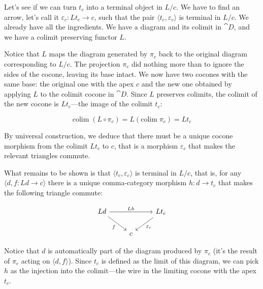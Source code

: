 \documentclass[DaoFP]{subfiles}
\begin{document}
Let's see if we can turn $t_c$ into a terminal object in $L/c$. We have to find an arrow, let's call it $\varepsilon_c \colon L t_c \to c$, such that the pair $\langle t_c, \varepsilon_c \rangle$ is terminal in $L/c$. We already have all the ingredients. We have a diagram and its colimit in $\cat D$, and we have a colimit preserving functor $L$. 

Notice that $L$ maps the diagram generated by $\pi_c$ back to the original diagram corresponding to $L/c$. The projection $\pi_c$ did nothing more than to ignore the sides of the cocone, leaving its base intact. We now have two cocones with the same base: the original one with the apex $c$ and the new one obtained by applying $L$ to the colimit cocone in $\cat D$. Since $L$ preserves colimits, the colimit of the new cocone is $L t_c$---the image of the colimit $t_c$:

\[ \text{colim} \; (L \circ \pi_c) = L ( \text{colim} \; \pi_c) = L t_c\]

By universal construction, we deduce that there must be a unique cocone morphism from the colimit $L t_c$ to $c$, that is a morphism $\varepsilon_c$ that makes the relevant triangles commute. 

What remains to be shown is that $\langle t_c, \varepsilon_c \rangle$ is terminal in $L/c$, that is, for any  $\langle d, f \colon L d \to c \rangle$ there is a unique comma-category morphism $h \colon d \to t_c$ that makes the following triangle commute:

\[
 \begin{tikzcd}
 L d
 \arrow[rd, "f"']
 \arrow[rr, "L h"]
 && L t_c
 \arrow[ld, "\varepsilon_c"]
 \\
 &c
  \end{tikzcd}
\]

Notice that $d$ is automatically part of the diagram produced by $\pi_c$ (it's the result of $\pi_c$ acting on $\langle d, f \rangle$). Since $t_c$ is defined as the limit of this diagram, we can pick $h$ as the injection into the colimit---the wire in the limiting cocone with the apex $t_c$. 
\end{document}

